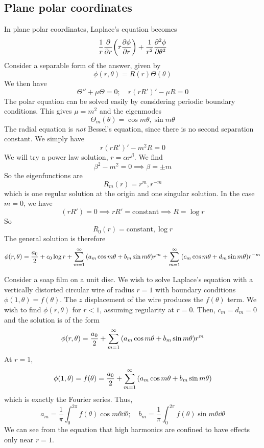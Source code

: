 \subsection{Plane polar coordinates}
In plane polar coordinates, Laplace's equation becomes
\[
	\frac{1}{r} \pdv{r} \qty(r \pdv{\phi}{r}) + \frac{1}{r^2} \pdv[2]{\phi}{\theta}
\]
Consider a separable form of the answer, given by
\[
	\phi(r,\theta) = R(r) \Theta(\theta)
\]
We then have
\[
	\Theta'' + \mu \Theta = 0;\quad r(rR')' - \mu R = 0
\]
The polar equation can be solved easily by considering periodic boundary conditions.
This gives \( \mu = m^2 \) and the eigenmodes
\[
	\Theta_m(\theta) = \cos m \theta, \sin m \theta
\]
The radial equation is \textit{not} Bessel's equation, since there is no second separation constant.
We simply have
\[
	r(rR')' - m^2 R = 0
\]
We will try a power law solution, \( r = \alpha r^\beta \).
We find
\[
	\beta^2 - m^2 = 0 \implies \beta = \pm m
\]
So the eigenfunctions are
\[
	R_m(r) = r^m, r^{-m}
\]
which is one regular solution at the origin and one singular solution.
In the case \( m = 0 \), we have
\[
	(rR') = 0 \implies rR' = \text{constant} \implies R = \log r
\]
So
\[
	R_0(r) = \text{constant}, \log r
\]
The general solution is therefore
\[
	\phi(r,\theta) = \frac{a_0}{2} + c_0 \log r + \sum_{m=1}^\infty \qty(a_m \cos m\theta + b_m \sin m\theta) r^m + \sum_{m=1}^\infty \qty(c_m \cos m\theta + d_m \sin m\theta) r^{-m}
\]
\begin{example}
	Consider a soap film on a unit disc.
	We wish to solve Laplace's equation with a vertically distorted circular wire of radius \( r = 1 \) with boundary conditions \( \phi(1, \theta) = f(\theta) \).
	The \( z \) displacement of the wire produces the \( f(\theta) \) term.
	We wish to find \( \phi(r,\theta) \) for \( r < 1 \), assuming regularity at \( r = 0 \).
	Then, \( c_m = d_m = 0 \) and the solution is of the form
	\[
		\phi(r,\theta) = \frac{a_0}{2} + \sum_{m=1}^\infty \qty(a_m \cos m\theta + b_m \sin m\theta) r^m
	\]
	At \( r = 1 \),
	\[
		\phi(1,\theta) = f(\theta) = \frac{a_0}{2} + \sum_{m=1}^\infty \qty(a_m \cos m\theta + b_m \sin m\theta)
	\]
	which is exactly the Fourier series.
	Thus,
	\[
		a_m = \frac{1}{\pi} \int_0^{2\pi} f(\theta) \cos m \theta \dd{\theta};\quad b_m = \frac{1}{\pi} \int_0^{2\pi} f(\theta) \sin m \theta \dd{\theta}
	\]
	We can see from the equation that high harmonics are confined to have effects only near \( r = 1 \).
\end{example}
